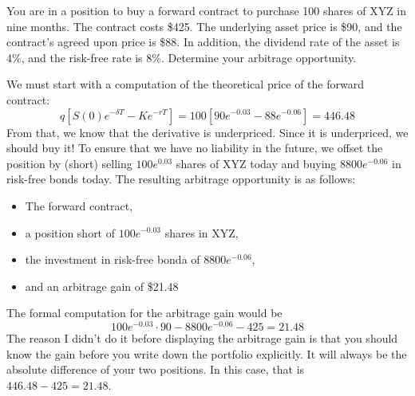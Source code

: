 \documentclass{ximera}
\begin{document}
\begin{example}
You are in a position to buy a forward contract to purchase 100 shares of XYZ in nine months. The contract costs \$425. The underlying asset price is \$90, and the contract's agreed upon price is \$88. In addition, the dividend rate of the asset is 4\%, and the risk-free rate is 8\%. Determine your arbitrage opportunity.
\end{example}

\begin{solution}
We must start with a computation of the theoretical price of the forward contract:
	\begin{equation*}
	q[S(0)e^{-\delta T}-Ke^{-rT}]=100[90e^{-0.03}-88e^{-0.06}]=446.48
	\end{equation*}
From that, we know that the derivative is underpriced. Since it is underpriced, we should buy it! To ensure that we have no liability in the future, we offset the position by (short) selling $100e^{0.03}$ shares of XYZ today and buying $8800e^{-0.06}$ in risk-free bonds today. The resulting arbitrage opportunity is as follows:
	\begin{itemize}
	\item The forward contract,
	\item a position short of $100e^{-0.03}$ shares in XYZ,
	\item the investment in risk-free bonda of $8800e^{-0.06}$,
	\item and an arbitrage gain of \$21.48
	\end{itemize}
The formal computation for the arbitrage gain would be
	\begin{equation*}
	100e^{-0.03}\cdot 90-8800e^{-0.06}-425=21.48
	\end{equation*}
The reason I didn't do it before displaying the arbitrage gain is that you should know the gain before you write down the portfolio explicitly. It will always be the absolute difference of your two positions. In this case, that is $446.48-425=21.48$.
\end{solution}
\end{document}
